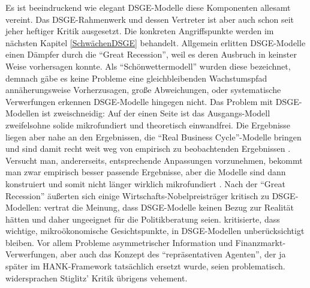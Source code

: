 Es ist beeindruckend wie elegant DSGE-Modelle diese Komponenten allesamt vereint. Das DSGE-Rahmenwerk und dessen Vertreter ist aber auch schon seit jeher heftiger Kritik ausgesetzt. Die konkreten Angriffspunkte werden im nächsten Kapitel \ref{SchwächenDSGE} behandelt. Allgemein erlitten DSGE-Modelle einen Dämpfer durch die "`Great Recession"', weil es deren Ausbruch in keinster Weise vorhersagen konnte. Als "`Schönwettermodell"' wurden diese bezeichnet, demnach gäbe es keine Probleme eine gleichbleibenden Wachstumspfad annäherungsweise Vorherzusagen, große Abweichungen, oder systematische Verwerfungen erkennen DSGE-Modelle hingegen nicht. Das Problem mit DSGE-Modellen ist zweischneidig: Auf der einen Seite ist das Ausgangs-Modell \parencite{Gali2000} zweifelsohne solide mikrofundiert und theoretisch einwandfrei. Die Ergebnisse liegen aber nahe an den Ergebnissen, die "`Real Business Cycle"'-Modelle bringen und sind damit recht weit weg von empirisch zu beobachtenden Ergebnissen \parencite[S. 311]{Romer2019}. Versucht man, andererseits, entsprechende Anpassungen vorzunehmen, bekommt man zwar empirisch besser passende Ergebnisse, aber die Modelle sind dann konstruiert und somit nicht länger wirklich mikrofundiert \parencite[S. 364]{Romer2019}. 
Nach der "`Great Recession"' äußerten sich einige Wirtschafts-Nobelpreisträger kritisch zu DSGE-Modellen: \textcite{Solow2010} vertrat die Meinung, dass DSGE-Modelle keinen Bezug zur Realität hätten und daher ungeeignet für die Politikberatung seien. \textcite{Stiglitz2017} kritisierte, dass wichtige, mikroökonomische Gesichtspunkte, in  DSGE-Modellen unberücksichtigt bleiben. Vor allem Probleme asymmetrischer Information und Finanzmarkt-Verwerfungen, aber auch das Konzept des "`repräsentativen Agenten"', der ja später im HANK-Framework tatsächlich ersetzt wurde, seien problematisch. \textcite[S. 133]{Christiano2018} widersprachen Stiglitz' Kritik übrigens vehement.

